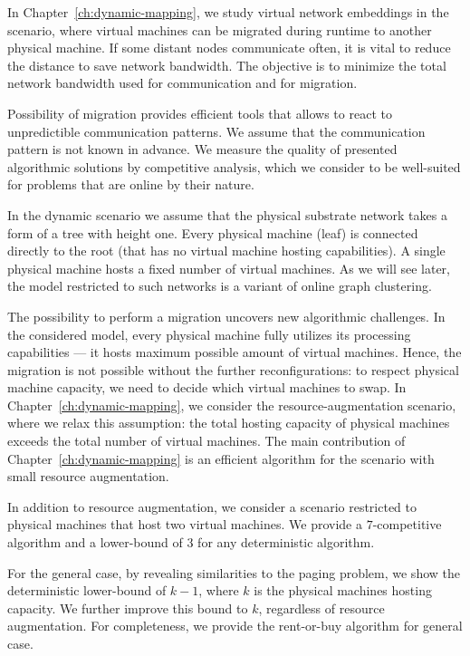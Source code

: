 In Chapter~\ref{ch:dynamic-mapping}, we study virtual network embeddings in the scenario, where virtual machines can be migrated during runtime to another physical machine.
If some distant nodes communicate often, it is vital to reduce the distance to save network bandwidth.
The objective is to minimize the total network bandwidth used for communication and for migration.

Possibility of migration provides efficient tools that allows to react to unpredictible communication patterns.
We assume that the communication pattern is not known in advance.
We measure the quality of presented algorithmic solutions by competitive analysis, which we consider to be well-suited for problems that are online by their nature.

In the dynamic scenario we assume that the physical substrate network takes a form of a tree with height one.
Every physical machine (leaf) is connected directly to the root (that has no virtual machine hosting capabilities).
A single physical machine hosts a fixed number of virtual machines.
As we will see later, the model restricted to such networks is a variant of online graph clustering.


The possibility to perform a migration uncovers new algorithmic challenges.
In the considered model, every physical machine fully utilizes its processing capabilities --- it hosts maximum possible amount of virtual machines.
Hence, the migration is not possible without the further reconfigurations: to respect physical machine capacity, we need to decide which virtual machines to swap.
In Chapter~\ref{ch:dynamic-mapping}, we consider the resource-augmentation scenario, where we relax this assumption: the total hosting capacity of physical machines exceeds the total number of virtual machines.
The main contribution of Chapter~\ref{ch:dynamic-mapping} is an efficient algorithm for the scenario with small resource augmentation.

In addition to resource augmentation, we consider a scenario restricted to physical machines that host two virtual machines.
We provide a $7$-competitive algorithm and a lower-bound of $3$ for any deterministic algorithm.

For the general case, by revealing similarities to the paging problem, we show the deterministic lower-bound of $k-1$, where $k$ is the physical machines hosting capacity.
We further improve this bound to $k$, regardless of resource augmentation.
For completeness, we provide the rent-or-buy algorithm for general case.

